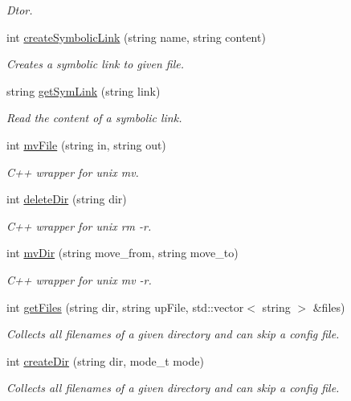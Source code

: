 \begin{DoxyCompactItemize}
\begin{DoxyCompactList}\small\item\em Dtor. \end{DoxyCompactList}\item 
int \hyperlink{classUnixBridge_ab27429b32f913986d0aac1c69bcba6f3}{create\-Symbolic\-Link} (string name, string content)
\begin{DoxyCompactList}\small\item\em Creates a symbolic link to given file. \end{DoxyCompactList}\item 
string \hyperlink{classUnixBridge_a818d57b1f182e3fe4dcf84eb5b6e5df1}{get\-Sym\-Link} (string link)
\begin{DoxyCompactList}\small\item\em Read the content of a symbolic link. \end{DoxyCompactList}\item 
int \hyperlink{classUnixBridge_adc00f8d0d5dd0a3b2cbb654172ec8902}{mv\-File} (string in, string out)
\begin{DoxyCompactList}\small\item\em C++ wrapper for unix mv. \end{DoxyCompactList}\item 
int \hyperlink{classUnixBridge_a721962a7dd9e4654d32c171854f7fbce}{delete\-Dir} (string dir)
\begin{DoxyCompactList}\small\item\em C++ wrapper for unix rm -\/r. \end{DoxyCompactList}\item 
int \hyperlink{classUnixBridge_a9c44f87fedf0e1933e084c4f9c8571dc}{mv\-Dir} (string move\-\_\-from, string move\-\_\-to)
\begin{DoxyCompactList}\small\item\em C++ wrapper for unix mv -\/r. \end{DoxyCompactList}\item 
int \hyperlink{classUnixBridge_a92f44a047ec7bb277151363bea147054}{get\-Files} (string dir, string up\-File, std\-::vector$<$ string $>$ \&files)
\begin{DoxyCompactList}\small\item\em Collects all filenames of a given directory and can skip a config file. \end{DoxyCompactList}\item 
int \hyperlink{classUnixBridge_a1357f426d25f8093b1f8ccc1bb01be0e}{create\-Dir} (string dir, mode\-\_\-t mode)
\begin{DoxyCompactList}\small\item\em Collects all filenames of a given directory and can skip a config file. \end{DoxyCompactList}\end{DoxyCompactItemize}

